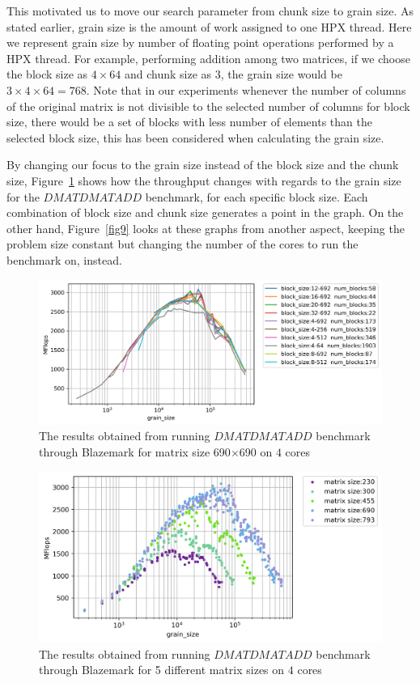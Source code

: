 This motivated us to move our search parameter from chunk size to grain size. As stated earlier, grain size is the amount of work assigned to one HPX thread. Here we represent grain size by number of floating point operations performed by a HPX thread. For example, performing addition among two matrices, if we choose the block size as $4\times64$ and chunk size as $3$, the grain size would be $3\times4\times64=768$. 
Note that in our experiments whenever the number of columns of the original matrix is not divisible to the selected number of columns for block size, there would be a set of blocks with less number of elements than the selected block size, this has been considered when calculating the grain size.  

By changing our focus to the grain size instead of the block size and the chunk size, Figure~\ref{fig6} shows how the throughput changes with regards to the grain size for the $DMATDMATADD$ benchmark, for each specific block size. Each combination of block size and chunk size generates a point in the graph. On the other hand, Figure~\ref{fig9} looks at these graphs from another aspect, keeping the problem size constant but changing the number of the cores to run the benchmark on, instead.

\begin{figure}[H]
	\centering\includegraphics[width=1\linewidth]{images/fig6.png}
	\caption{The results obtained from running $DMATDMATADD$ benchmark through Blazemark for matrix size 690$\times$690 on $4$ cores}	
	\label{fig6}
\end{figure}

\begin{figure}[H]
	\centering
	\hspace*{-2cm}\includegraphics[scale=.75]{images/fig8.png}
	\caption{The results obtained from running $DMATDMATADD$ benchmark through Blazemark for 5 different matrix sizes on $4$ cores}	
	\label{fig7}
\end{figure}

